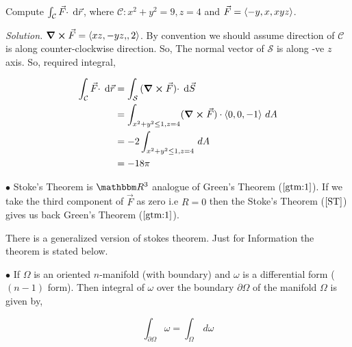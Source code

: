 \documentclass[../Analysis-3]{subfiles}
\begin{document}
\begin{Eg}{}{}
    Compute $\int_{\mathcal{C}} {\vec{F} \cdot } \hspace{0.1cm} \dd {\vec{r}}$, where $\mathcal{C} : x^2 +y^2 = 9 , z =4$ and $\vec{F} = \left\langle {-y,x}, {xyz} \right\rangle$.

    \textit{Solution.} $\curl \vec{F} = \left\langle {xz,-yz,}, {2} \right\rangle$. By convention we should assume direction of $\mathcal{C}$ is along counter-clockwise direction. So,  The normal vector of $\mathcal{S}$ is along -ve $z$ axis. So, required integral,

    \begin{align*}
        \int_{\mathcal{C}} {\vec{F} \cdot } \hspace{0.1cm} \dd {\vec{r}} & = \int_{\mathcal{S}} {(\curl \vec{F}) \cdot} \hspace{0.1cm} \dd {\vec{S}}                    \\
                                                    & = \int_{x^2+y^2 \le 1 , z =4 } (\curl \vec{F}) \cdot \left\langle {0,0}, {-1} \right\rangle \,dA \\
                                                    & = -2 \int_{x^2+y^2 \le 1 , z =4} \,dA                                   \\
                                                    & = -18\pi
    \end{align*}

\end{Eg}


$\bullet$ Stoke's Theorem is $\R^3$ analogue of Green's Theorem ($\ref{gtm:1}$). If we take the third component of $\vec{F}$ as zero i.e $R =0$ then the Stoke's Theorem ($\ref{ST}$) gives us back Green's Theorem ($\ref{gtm:1}$).

\begin{tcolorbox}
    There is a generalized version of stokes theorem. Just for Information the theorem is stated below.

    $\bullet$ If $\Omega$ is an oriented $n$-manifold (with boundary) and $\omega$ is a differential form ($(n-1)$ form). Then integral of $\omega$ over the boundary $\partial \Omega$ of the manifold $\Omega$ is given by,

    \[\int_{\partial \Omega} \omega = \int_{\Omega} \,d \omega\]

\end{tcolorbox}
\end{document}
